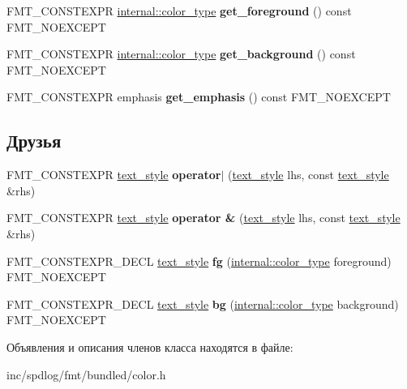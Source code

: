 \begin{DoxyCompactItemize}
F\+M\+T\+\_\+\+C\+O\+N\+S\+T\+E\+X\+PR \hyperlink{structinternal_1_1color__type}{internal\+::color\+\_\+type} {\bfseries get\+\_\+foreground} () const F\+M\+T\+\_\+\+N\+O\+E\+X\+C\+E\+PT
\item 
\mbox{\label{classtext__style_a00fb4a1cc65844bc819f71a80050181f}} 
F\+M\+T\+\_\+\+C\+O\+N\+S\+T\+E\+X\+PR \hyperlink{structinternal_1_1color__type}{internal\+::color\+\_\+type} {\bfseries get\+\_\+background} () const F\+M\+T\+\_\+\+N\+O\+E\+X\+C\+E\+PT
\item 
\mbox{\label{classtext__style_aecbbaaf438871b55905c4beaea7318b5}} 
F\+M\+T\+\_\+\+C\+O\+N\+S\+T\+E\+X\+PR emphasis {\bfseries get\+\_\+emphasis} () const F\+M\+T\+\_\+\+N\+O\+E\+X\+C\+E\+PT
\end{DoxyCompactItemize}
\subsection*{Друзья}
\begin{DoxyCompactItemize}
\item 
\mbox{\label{classtext__style_a35023459e415ef79bccff971618bfc1f}} 
F\+M\+T\+\_\+\+C\+O\+N\+S\+T\+E\+X\+PR \hyperlink{classtext__style}{text\+\_\+style} {\bfseries operator$\vert$} (\hyperlink{classtext__style}{text\+\_\+style} lhs, const \hyperlink{classtext__style}{text\+\_\+style} \&rhs)
\item 
\mbox{\label{classtext__style_ad91686b3587b1ed9a9066210ac5efa0d}} 
F\+M\+T\+\_\+\+C\+O\+N\+S\+T\+E\+X\+PR \hyperlink{classtext__style}{text\+\_\+style} {\bfseries operator \&} (\hyperlink{classtext__style}{text\+\_\+style} lhs, const \hyperlink{classtext__style}{text\+\_\+style} \&rhs)
\item 
\mbox{\label{classtext__style_aba4da2dafd6afe1360a856a03db2eddd}} 
F\+M\+T\+\_\+\+C\+O\+N\+S\+T\+E\+X\+P\+R\+\_\+\+D\+E\+CL \hyperlink{classtext__style}{text\+\_\+style} {\bfseries fg} (\hyperlink{structinternal_1_1color__type}{internal\+::color\+\_\+type} foreground) F\+M\+T\+\_\+\+N\+O\+E\+X\+C\+E\+PT
\item 
\mbox{\label{classtext__style_a7eec86de8721ad96ef9b700d47f0d1e1}} 
F\+M\+T\+\_\+\+C\+O\+N\+S\+T\+E\+X\+P\+R\+\_\+\+D\+E\+CL \hyperlink{classtext__style}{text\+\_\+style} {\bfseries bg} (\hyperlink{structinternal_1_1color__type}{internal\+::color\+\_\+type} background) F\+M\+T\+\_\+\+N\+O\+E\+X\+C\+E\+PT
\end{DoxyCompactItemize}


Объявления и описания членов класса находятся в файле\+:\begin{DoxyCompactItemize}
\item 
inc/spdlog/fmt/bundled/color.\+h\end{DoxyCompactItemize}
